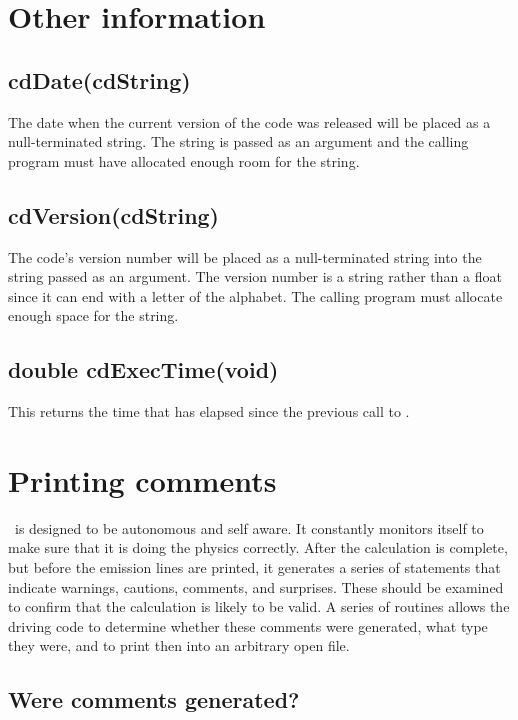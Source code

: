 \section{Other information}

\subsection{cdDate(cdString) }

The date when the current version of the code was released will be placed
as a null-terminated string.  The string is passed as an argument and the
calling program must have allocated enough room for the string.

\subsection{cdVersion(cdString) }

The code's version number will be placed as a null-terminated string
into the string passed as an argument.
The version number is a string rather
than a float since it can end with a letter of the alphabet.
The calling
program must allocate enough space for the string.

\subsection{double cdExecTime(void) }

This returns the time that has elapsed since the previous call
to .

\section{Printing comments}

\Cloudy\ is designed to be autonomous and self aware.
It constantly
monitors itself to make sure that it is doing the physics correctly.  After
the calculation is complete, but before the emission lines are printed,
it generates a series of statements that indicate warnings, cautions,
comments, and surprises.
These should be examined to confirm that the
calculation is likely to be valid.
A series of routines allows the driving
code to determine whether these comments were generated, what type they
were, and to print then into an arbitrary open file.

\subsection{Were comments generated?}

